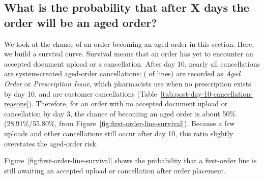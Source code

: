 \subsection{What is the probability that after X days the order will be an aged order?}
\label{subsec:survival-analysis}


We look at the chance of an order becoming an aged order in this
section. Here, we build a survival curve. Survival means that an order
has yet to encounter an accepted document upload or a cancellation.
After day 10, nearly all cancellations are system-created aged-order
cancellations: \PostDayTenAgingShare{} (\PostDayTenAgingLines{} of
\PostDayTenTotalLines{} lines) are recorded as \emph{Aged Order} or
\emph{Prescription Issue}, which pharmacists use when no prescription
exists by day 10, and \PostDayTenCustomerShare{} are customer
cancellations (Table~\ref{tab:post-day-10-cancellation-reasons}).
Therefore, for an order with no accepted document upload or
cancellation by day 3, the chance of becoming an aged order is about
50\% (28.91\%/55.80\%, from Figure~\ref{fig:first-order-line-survival}).
Because a few uploads and other cancellations still occur after day 10,
this ratio slightly overstates the aged-order risk.

Figure~\ref{fig:first-order-line-survival} shows the probability that a first-order
line is still awaiting an accepted upload or cancellation after order placement.



